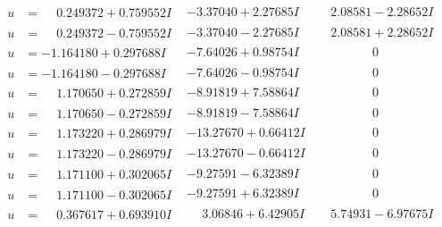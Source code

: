 \documentclass[1p]{elsarticle_modified}
\theoremstyle{definition}
\begin{document}
$$\begin{array}{c|c|c}
\begin{aligned}
u &= \phantom{-}0.249372 + 0.759552 I\end{aligned}
 & -3.37040 + 2.27685 I & \phantom{-}2.08581 - 2.28652 I \\ \hline\begin{aligned}
u &= \phantom{-}0.249372 - 0.759552 I\end{aligned}
 & -3.37040 - 2.27685 I & \phantom{-}2.08581 + 2.28652 I \\ \hline\begin{aligned}
u &= -1.164180 + 0.297688 I\end{aligned}
 & -7.64026 + 0.98754 I & \phantom{-0.000000 } 0 \\ \hline\begin{aligned}
u &= -1.164180 - 0.297688 I\end{aligned}
 & -7.64026 - 0.98754 I & \phantom{-0.000000 } 0 \\ \hline\begin{aligned}
u &= \phantom{-}1.170650 + 0.272859 I\end{aligned}
 & -8.91819 + 7.58864 I & \phantom{-0.000000 } 0 \\ \hline\begin{aligned}
u &= \phantom{-}1.170650 - 0.272859 I\end{aligned}
 & -8.91819 - 7.58864 I & \phantom{-0.000000 } 0 \\ \hline\begin{aligned}
u &= \phantom{-}1.173220 + 0.286979 I\end{aligned}
 & -13.27670 + 0.66412 I & \phantom{-0.000000 } 0 \\ \hline\begin{aligned}
u &= \phantom{-}1.173220 - 0.286979 I\end{aligned}
 & -13.27670 - 0.66412 I & \phantom{-0.000000 } 0 \\ \hline\begin{aligned}
u &= \phantom{-}1.171100 + 0.302065 I\end{aligned}
 & -9.27591 - 6.32389 I & \phantom{-0.000000 } 0 \\ \hline\begin{aligned}
u &= \phantom{-}1.171100 - 0.302065 I\end{aligned}
 & -9.27591 + 6.32389 I & \phantom{-0.000000 } 0 \\ \hline\begin{aligned}
u &= \phantom{-}0.367617 + 0.693910 I\end{aligned}
 & \phantom{-}3.06846 + 6.42905 I & \phantom{-}5.74931 - 6.97675 I \\ \hline\begin{aligned}

\end{aligned}
\end{array}$$
\end{document}
